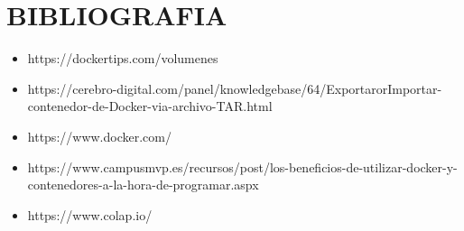 \section{BIBLIOGRAFIA} 

\begin{itemize}
\item https://dockertips.com/volumenes
\item https://cerebro-digital.com/panel/knowledgebase/64/ExportarorImportar-contenedor-de-Docker-via-archivo-TAR.html
\item  https://www.docker.com/
\item https://www.campusmvp.es/recursos/post/los-beneficios-de-utilizar-docker-y-contenedores-a-la-hora-de-programar.aspx
\item https://www.colap.io/

\end{itemize}